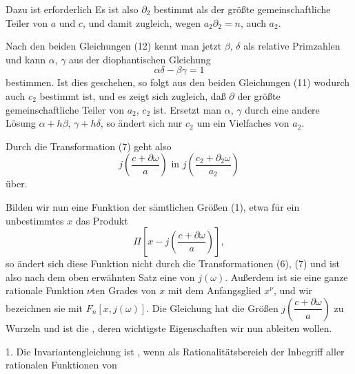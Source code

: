 Dazu ist erforderlich
Es ist also $\partial_2$ bestimmt als der größte gemeinschaftliche
Teiler von $a$ und $c$, und damit zugleich, wegen $a_2\partial_2 = n$, auch $a_2$.

Nach den beiden Gleichungen (12) kennt man jetzt $\beta$, $\delta$
als relative Primzahlen und kann $\alpha$, $\gamma$ aus der diophantischen
Gleichung
\[
\alpha\delta - \beta\gamma = 1
\]
bestimmen. Ist dies geschehen, so folgt aus den beiden
Gleichungen (11)
wodurch auch $c_2$ bestimmt ist, und es zeigt sich zugleich, daß $\partial$
der größte gemeinschaftliche Teiler von $a_2$, $c_2$ ist. Ersetzt man
$\alpha$, $\gamma$ durch eine andere Lösung $\alpha + h\beta$, $\gamma + h\delta$, so ändert sich
nur $c_2$ um ein Vielfaches von $a_2$.

Durch die Transformation (7) geht also
\[
j\left(\frac{c+\partial\omega}{a}\right) \text{ in } j\left(\frac{c_2+\partial_2\omega}{a_2}\right)
\]
über.

Bilden wir nun eine  Funktion der sämtlichen
Größen (1), etwa für ein unbestimmtes $x$ das Produkt
\[
\Pi\left[x - j\left(\frac{c+\partial\omega}{a}\right)\right],
\]
so ändert sich diese Funktion nicht durch die Transformationen
(6), (7) und ist also nach dem oben erwähnten Satz eine  von $j(\omega)$. Außerdem ist sie eine ganze rationale
Funktion $\nu$ten Grades von $x$ mit dem Anfangsglied $x^{\nu}$, und
wir bezeichnen sie mit $F_n[x, j(\omega)]$. Die Gleichung
hat die Größen $j\left(\dfrac{c+\partial\omega}{a}\right)$ zu Wurzeln und ist die ,
deren wichtigste Eigenschaften wir nun ableiten wollen.

1. Die Invariantengleichung ist , wenn als Rationalitätsbereich der Inbegriff aller rationalen Funktionen von
